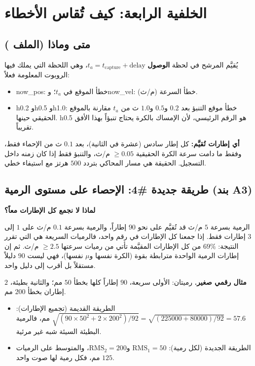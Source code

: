 \documentclass[11pt,a4paper]{article}
\newcommand{\en}[1]{\textenglish{#1}}
\newcommand{\code}[1]{\LR{\texttt{#1}}}
\begin{document}
\section{الخلفية الرابعة: كيف تُقاس الأخطاء}

\subsection{متى وماذا (الملف \code{estimators/metrics.py})}
يُقيَّم المرشح في لحظة \textbf{الوصول} $t_a=t_{\text{capture}}+\text{delay}$، وهي اللحظة التي يملك فيها الروبوت المعلومة فعلاً:
\begin{itemize}
\item \en{now\_pos}: خطأ الموقع في $t_a$؛ و\en{now\_vel}: خطأ السرعة (م/ث).
\item \en{h0.2} و\en{h0.5} و\en{h1.0}: خطأ موقع التنبؤ بعد $0.2$ و$0.5$ و$1.0$ ث من $t_a$ مقارنة بالموقع الحقيقي حينها.
\en{h0.5} هو الرقم الرئيسي، لأن الإمساك بالكرة يحتاج تنبؤاً بهذا الأفق تقريباً.
\end{itemize}
\textbf{أي إطارات تُقيَّم:} كل إطار سادس (عشرة في الثانية)، بعد $0.1$ ث من الإحماء فقط، وفقط ما دامت سرعة الكرة الحقيقية
$\ge0.05$ م/ث، والتنبؤ فقط إذا كان زمنه داخل التسجيل. الحقيقة هي مسار المحاكي بتردد $500$ هرتز مع استيفاء خطي.

\subsection{طريقة جديدة \#4: الإحصاء على مستوى الرمية (بند \en{A3})}
\textbf{لماذا لا نجمع كل الإطارات معاً؟}
\begin{example}
الرمية بسرعة $5$ م/ث قد تُقيَّم على نحو $90$ إطاراً، والرمية بسرعة $0.1$ م/ث على $1$ إلى $3$ إطارات فقط. إذا جمعنا كل الإطارات
في رقم واحد، فالرميات السريعة هي التي تقرر النتيجة: $69\%$ من كل الإطارات المقيَّمة تأتي من رميات سرعتها $\ge2.5$ م/ث.
ثم إن إطارات الرمية الواحدة مترابطة بقوة (الكرة نفسها و$\mu$ نفسها)، فهي ليست $90$ دليلاً مستقلاً بل أقرب إلى دليل واحد.
\end{example}

\textbf{مثال رقمي صغير.} رميتان: الأولى سريعة، $90$ إطاراً كلها بخطأ $50$ مم؛ والثانية بطيئة، $2$ إطاران بخطأ $200$ مم.
\begin{itemize}
\item الطريقة القديمة (تجميع الإطارات): $\sqrt{(90\times50^2+2\times200^2)/92}=\sqrt{(225000+80000)/92}=57.6$ مم، فالرمية البطيئة
السيئة شبه غير مرئية.
\item الطريقة الجديدة (لكل رمية): $\mathrm{RMS}_1=50$ و$\mathrm{RMS}_2=200$، والمتوسط على الرميات $125$ مم، فكل رمية لها صوت واحد.
\end{itemize}
\end{document}
